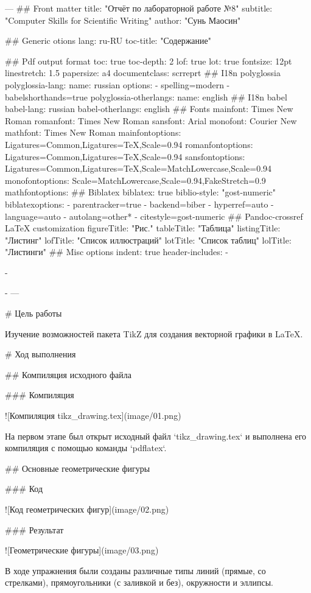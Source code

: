 ---
## Front matter
title: "Отчёт по лабораторной работе №8"
subtitle: "Computer Skills for Scientific Writing"
author: "Сунь Маосин"

## Generic otions
lang: ru-RU
toc-title: "Содержание"

## Pdf output format
toc: true
toc-depth: 2
lof: true
lot: true
fontsize: 12pt
linestretch: 1.5
papersize: a4
documentclass: scrreprt
## I18n polyglossia
polyglossia-lang:
  name: russian
  options:
    - spelling=modern
    - babelshorthands=true
polyglossia-otherlangs:
  name: english
## I18n babel
babel-lang: russian
babel-otherlangs: english
## Fonts
mainfont: Times New Roman
romanfont: Times New Roman
sansfont: Arial
monofont: Courier New
mathfont: Times New Roman
mainfontoptions: Ligatures=Common,Ligatures=TeX,Scale=0.94
romanfontoptions: Ligatures=Common,Ligatures=TeX,Scale=0.94
sansfontoptions: Ligatures=Common,Ligatures=TeX,Scale=MatchLowercase,Scale=0.94
monofontoptions: Scale=MatchLowercase,Scale=0.94,FakeStretch=0.9
mathfontoptions:
## Biblatex
biblatex: true
biblio-style: "gost-numeric"
biblatexoptions:
  - parentracker=true
  - backend=biber
  - hyperref=auto
  - language=auto
  - autolang=other*
  - citestyle=gost-numeric
## Pandoc-crossref LaTeX customization
figureTitle: "Рис."
tableTitle: "Таблица"
listingTitle: "Листинг"
lofTitle: "Список иллюстраций"
lotTitle: "Список таблиц"
lolTitle: "Листинги"
## Misc options
indent: true
header-includes:
  - \usepackage{indentfirst}
  - \usepackage{float}
  - 
---

# Цель работы

Изучение возможностей пакета TikZ для создания векторной графики в LaTeX.

# Ход выполнения

## Компиляция исходного файла

### Компиляция

![Компиляция tikz_drawing.tex](image/01.png)

На первом этапе был открыт исходный файл `tikz_drawing.tex` и выполнена его компиляция с помощью команды `pdflatex`.

## Основные геометрические фигуры

### Код

![Код геометрических фигур](image/02.png)

### Результат

![Геометрические фигуры](image/03.png)

В ходе упражнения были созданы различные типы линий (прямые, со стрелками), прямоугольники (с заливкой и без), окружности и эллипсы.

